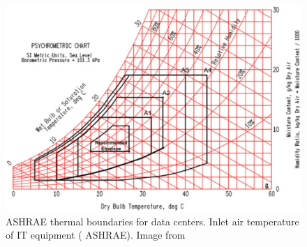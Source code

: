 \begin{figure} [!h]
\centering
\includegraphics[scale=.3]{methodology/images/psychrometric.eps}
\caption[ASHRAE thermal boundaries]{ASHRAE thermal boundaries for data centers. Inlet air temperature of IT equipment ( ASHRAE).  Image from \cite{joshi12}}
\label{psychrometric}
\end{figure}